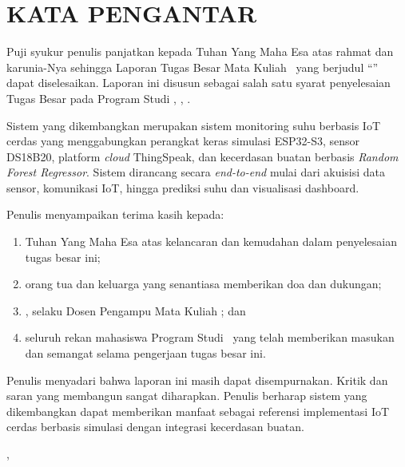 \clearpage
\chapter*{KATA PENGANTAR}
{}

Puji syukur penulis panjatkan kepada Tuhan Yang Maha Esa atas rahmat dan
karunia-Nya sehingga Laporan Tugas Besar Mata Kuliah \MataKuliah\ yang
berjudul ``\JudulTA'' dapat diselesaikan. Laporan ini disusun sebagai salah
satu syarat penyelesaian Tugas Besar pada Program Studi \ProgramStudi,
\Fakultas, \Universitas.

Sistem yang dikembangkan merupakan sistem monitoring suhu berbasis IoT
cerdas yang menggabungkan perangkat keras simulasi ESP32-S3, sensor DS18B20,
platform \textit{cloud} ThingSpeak, dan kecerdasan buatan berbasis
\textit{Random Forest Regressor}. Sistem dirancang secara \textit{end-to-end}
mulai dari akuisisi data sensor, komunikasi IoT, hingga prediksi suhu dan
visualisasi dashboard.

Penulis menyampaikan terima kasih kepada:
\begin{enumerate}[leftmargin=1.25cm]
    \item Tuhan Yang Maha Esa atas kelancaran dan kemudahan dalam penyelesaian
    tugas besar ini;
    \item orang tua dan keluarga yang senantiasa memberikan doa dan dukungan;
    \item \DosenPengampu, selaku Dosen Pengampu Mata Kuliah \MataKuliah; dan
    \item seluruh rekan mahasiswa Program Studi \ProgramStudi\ yang telah
    memberikan masukan dan semangat selama pengerjaan tugas besar ini.
\end{enumerate}

Penulis menyadari bahwa laporan ini masih dapat disempurnakan. Kritik dan
saran yang membangun sangat diharapkan. Penulis berharap sistem yang
dikembangkan dapat memberikan manfaat sebagai referensi implementasi IoT
cerdas berbasis simulasi dengan integrasi kecerdasan buatan.

\begin{flushright}
\Kota, \TanggalPengumpulan\\[1.5cm]
\NamaMahasiswa
\end{flushright}
